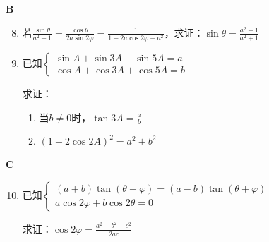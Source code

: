 \begin{center}
    \bfseries B
\end{center}

\begin{enumerate}\setcounter{enumi}{7}
    \item 若$\frac{\sin\theta}{a^2-1}=\frac{\cos\theta}{2a\sin2\varphi}=\frac{1}{1+2a\cos2\varphi+a^2}$，求证：$\sin\theta=\frac{a^2-1}{a^2+1}$

\item 已知$\begin{cases}
\sin A+\sin 3A+\sin5A=a\\
\cos A+\cos 3A+\cos5A=b
    \end{cases}$ 
    
求证：  \begin{enumerate}[(1)]
    \item 当$b\ne 0$时，$\tan 3A=\frac{a}{b}$
    \item $(1+2\cos2A)^2=a^2+b^2$
\end{enumerate}

\end{enumerate}

\begin{center}
    \bfseries C
\end{center}

\begin{enumerate}\setcounter{enumi}{9}
    \item 已知$\begin{cases}
       (a+b)\tan(\theta-\varphi)=(a-b)\tan(\theta+\varphi)\\
       a\cos2\varphi+b\cos2\theta=0
    \end{cases}$ 
    
    求证：$\cos2\varphi=\frac{a^2-b^2+c^2}{2ac}$
\end{enumerate}

